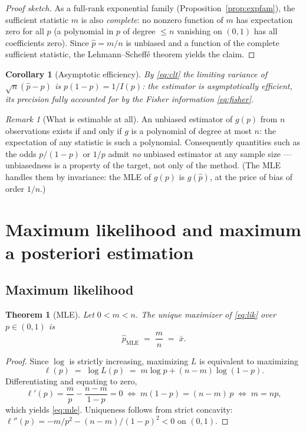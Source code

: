 \documentclass[11pt]{article}
\newtheorem{theorem}{Theorem}
\newtheorem{corollary}{Corollary}
\theoremstyle{remark}
\newtheorem{remark}{Remark}
\newcommand{\xbar}{\bar{x}}
\newcommand{\phat}{\hat{p}}
\begin{document}
\begin{proof}[Proof sketch]
As a full-rank exponential family (Proposition~\ref{prop:expfam}),
the sufficient statistic $m$ is also \emph{complete}: no nonzero
function of $m$ has expectation zero for all $p$ (a polynomial in $p$
of degree $\le n$ vanishing on $(0,1)$ has all coefficients zero).
Since $\phat = m/n$ is unbiased and a function of the complete
sufficient statistic, the Lehmann--Scheff\'e theorem yields the claim.
\end{proof}

\begin{corollary}[Asymptotic efficiency]
By \eqref{eq:clt} the limiting variance of $\sqrt{n}(\phat - p)$ is
$p(1-p) = 1/I(p)$: the estimator is asymptotically efficient, its
precision fully accounted for by the Fisher information
\eqref{eq:fisher}.
\end{corollary}

\begin{remark}[What is estimable at all]
An unbiased estimator of $g(p)$ from $n$ observations exists if and
only if $g$ is a polynomial of degree at most $n$: the expectation of
any statistic is such a polynomial. Consequently quantities such as
the odds $p/(1-p)$ or $1/p$ admit \emph{no} unbiased estimator at any
sample size --- unbiasedness is a property of the target, not only of
the method. (The MLE handles them by invariance:
the MLE of $g(p)$ is $g(\phat)$, at the price of bias of order
$1/n$.)
\end{remark}

\section{Maximum likelihood and maximum a posteriori estimation}

\subsection{Maximum likelihood}

\begin{theorem}[MLE]
\label{thm:mle}
Let $0 < m < n$. The unique maximizer of \eqref{eq:lik} over
$p \in (0,1)$ is
\begin{equation}
  \boxed{\;\phat_{\mathrm{MLE}} \;=\; \frac{m}{n} \;=\; \xbar.\;}
  \label{eq:mle}
\end{equation}
\end{theorem}

\begin{proof}
Since $\log$ is strictly increasing, maximizing $L$ is equivalent to
maximizing
\begin{equation}
  \ell(p) \;=\; \log L(p) \;=\; m \log p + (n - m)\log(1 - p).
  \label{eq:loglik}
\end{equation}
Differentiating and equating to zero,
\begin{equation*}
  \ell'(p) = \frac{m}{p} - \frac{n-m}{1-p} = 0
  \;\Longleftrightarrow\;
  m(1-p) = (n-m)\,p
  \;\Longleftrightarrow\;
  m = np,
\end{equation*}
which yields \eqref{eq:mle}. Uniqueness follows from strict concavity:
$\ell''(p) = -m/p^{2} - (n-m)/(1-p)^{2} < 0$ on $(0,1)$.
\end{proof}
\end{document}
